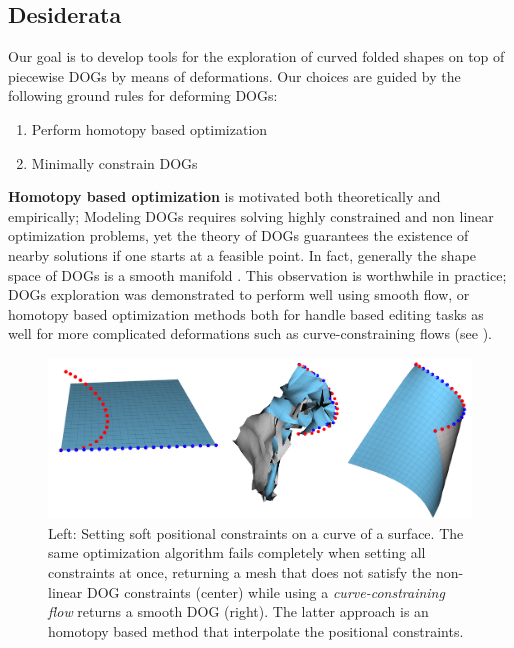 \subsection{Desiderata}
Our goal is to develop tools for the exploration of curved folded shapes on top of piecewise DOGs by means of deformations. Our choices are guided by the following ground rules for deforming DOGs:
\begin{enumerate}
  \item Perform homotopy based optimization \label{homotopy_opt}
  \item Minimally constrain DOGs \label{minimal_const}
\end{enumerate}
\textbf{Homotopy based optimization} is motivated both theoretically and empirically; Modeling DOGs requires solving highly constrained and non linear optimization problems, yet the theory of DOGs guarantees the existence of nearby solutions if one starts at a feasible point. In fact, generally the shape space of DOGs is a smooth manifold \cite{rabi2018shape}. This observation is worthwhile in practice; DOGs exploration was demonstrated to perform well using smooth flow, or homotopy based optimization methods both for handle based editing tasks as well for more complicated deformations such as curve-constraining flows \cite{rabi2018shape} (see ).
\begin{figure} [h]
	\centering
	\includegraphics[width=0.8\linewidth]{figures/homotopy_curve}
	\caption{Left: Setting soft positional constraints on a curve of a surface. The same optimization algorithm fails completely when setting all constraints at once, returning a mesh that does not satisfy the non-linear DOG constraints (center) while using a \textit{curve-constraining flow} \cite{rabi2018shape} returns a smooth DOG (right). The latter approach is an homotopy based method that interpolate the positional constraints.} 
	\label{fig:homotopy_curve}
\end{figure}
